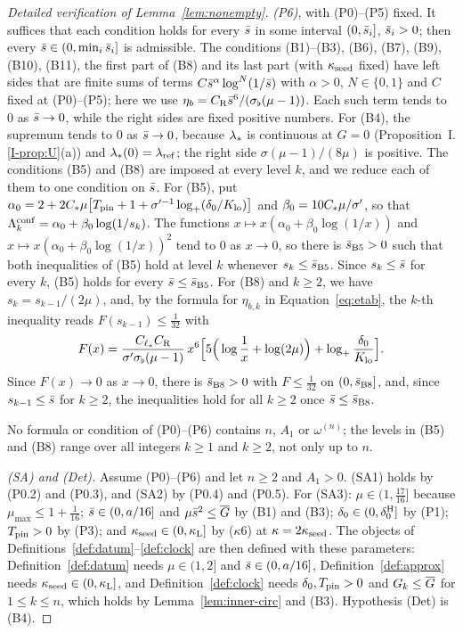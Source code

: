 \begin{proof}[Detailed verification of Lemma~\ref{lem:nonempty}]
\emph{(P6)}, with (P0)--(P5) fixed. It suffices that each condition holds for
every $\bar s$ in some interval $(0,\bar s_i]$, $\bar s_i>0$; then
every $\bar s\in(0,\min_i\bar s_i]$ is admissible. The conditions (B1)--(B3), (B6), (B7), (B9),
(B10), (B11), the first part of (B8) and its last part (with $\kappa_{\mathrm{seed}}$ fixed)
have left sides that are finite sums of terms $C\bar s^\alpha\log^N(1/\bar s)$ with
$\alpha>0$, $N\in\{0,1\}$ and $C$ fixed at (P0)--(P5); here we use
$\eta_b=C_{\mathrm R}\bar s^6/(\sigma_\flat(\mu-1))$. Each such term tends to $0$ as
$\bar s\to0$, while the right sides are fixed positive numbers. For (B4), the
supremum tends to $0$ as $\bar s\to0$, because $\lambda_*$ is continuous at $G=0$
(Proposition~I.\ref{I-prop:U}\textup{(a)}) and $\lambda_*(0)=\lambda_{\mathrm{ref}}$; the right side
$\sigma(\mu-1)/(8\mu)$ is positive. The conditions (B5) and (B8) are imposed at
every level $k$, and we reduce each of them to one condition on $\bar s$. For
(B5), put
$\alpha_0=2+2C_{*}\mu\big[T_{\mathrm{pin}}+1+\sigma'^{-1}\log_+(\delta_0/K_{\mathrm{lo}})\big]$ and
$\beta_0=10C_{*}\mu/\sigma'$, so that $\Lambda^{\mathrm{conf}}_k=\alpha_0+\beta_0\log(1/s_k)$.
The functions $x\mapsto x(\alpha_0+\beta_0\log(1/x))$ and
$x\mapsto x(\alpha_0+\beta_0\log(1/x))^2$
tend to $0$ as $x\to0$, so there is $\bar s_{\mathrm{B5}}>0$ such that both inequalities of
(B5) hold at level $k$ whenever $s_k\le\bar s_{\mathrm{B5}}$. Since $s_k\le\bar s$ for every
$k$, (B5) holds for every $\bar s\le\bar s_{\mathrm{B5}}$. For (B8) and $k\ge2$, we have
$s_k=s_{k-1}/(2\mu)$, and, by the formula for $\eta_{b,k}$ in
Equation~\eqref{eq:etab}, the $k$-th inequality reads $F(s_{k-1})\le\frac1{32}$
with
\[
F(x)=\frac{C_{\ell_*}C_{\mathrm R}}{\sigma'\sigma_\flat(\mu-1)}\,x^6\Big[5\Big(\log\frac1x+\log(2\mu)\Big)+\log_+\frac{\delta_0}{K_{\mathrm{lo}}}\Big].
\]
Since $F(x)\to0$ as $x\to0$, there is $\bar s_{\mathrm{B8}}>0$ with $F\le\frac1{32}$ on
$(0,\bar s_{\mathrm{B8}}]$, and, since $s_{k-1}\le\bar s$ for $k\ge2$, the
inequalities hold for all $k\ge2$ once $\bar s\le\bar s_{\mathrm{B8}}$.

No formula or condition of (P0)--(P6) contains $n$, $A_1$ or $\omega^{(n)}$; the
levels in (B5) and (B8) range over all integers $k\ge1$ and $k\ge2$, not only
up to $n$.

\emph{(SA) and (Det).} Assume (P0)--(P6) and let $n\ge2$ and $A_1>0$. (SA1) holds by (P0.2) and (P0.3), and (SA2) by (P0.4) and (P0.5). For
(SA3): $\mu\in(1,\frac{17}{16}]$ because
$\mu_{\max}\le1+\frac1{16}$; $\bar s\in(0,a/16]$ and $\mu\bar s^2\le\overline{G}$ by (B1) and (B3);
$\delta_0\in(0,\delta_0^{\mathrm{H}}]$ by (P1); $T_{\mathrm{pin}}>0$ by (P3); and $\kappa_{\mathrm{seed}}\in(0,\kappa_{\mathrm{L}}]$ by
($\kappa$6) at $\kappa=2\kappa_{\mathrm{seed}}$. The objects of
Definitions~\ref{def:datum}--\ref{def:clock} are then defined with these
parameters: Definition~\ref{def:datum} needs $\mu\in(1,2]$ and $\bar s\in(0,a/16]$,
Definition~\ref{def:approx} needs $\kappa_{\mathrm{seed}}\in(0,\kappa_{\mathrm{L}}]$, and
Definition~\ref{def:clock} needs $\delta_0,T_{\mathrm{pin}}>0$ and $G_k\le\overline{G}$ for
$1\le k\le n$, which holds by Lemma~\ref{lem:inner-circ} and (B3). Hypothesis
(Det) is (B4).
\end{proof}
